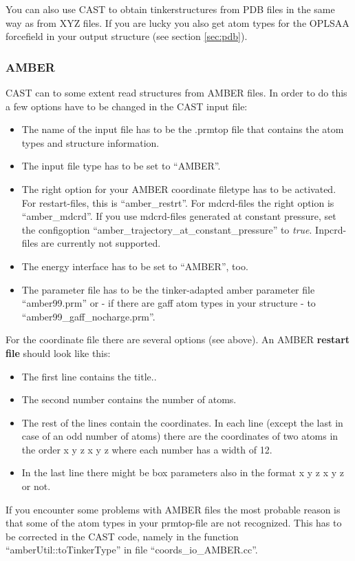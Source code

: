 \documentclass[10pt,a4paper]{article} %
\begin{document}
	You can also use CAST to obtain tinkerstructures from PDB files in the same way as from XYZ files. If you are lucky you also get atom types for the OPLSAA forcefield in your output structure (see section \ref{sec:pdb}).
	
	\subsubsection{AMBER}

\ac{CAST} can to some extent read structures from \ac{AMBER} files. In order to do this a few options have to be changed in the CAST input file:
\begin{itemize}
\item The name of the input file has to be the .prmtop file that contains the atom types and structure information.
\item The input file type has to be set to ``AMBER''.
\item The right option for your AMBER coordinate filetype has to be activated. For restart-files, this is ``amber\_restrt''. For mdcrd-files the right option is ``amber\_mdcrd''. If you use mdcrd-files generated at constant pressure, set the configoption ``amber\_trajectory\_at\_constant\_pressure'' to \textit{true}. Inpcrd-files are currently not supported.
\item The energy interface has to be set to ``AMBER'', too.
\item The parameter file has to be the tinker-adapted amber parameter file ``amber99.prm'' or - if there are gaff atom types in your structure - to ``amber99\_gaff\_nocharge.prm''.
\end{itemize}

For the coordinate file there are several options (see above). An AMBER \textbf{restart file }should look like this:
\begin{itemize}
\item The first line contains the title..
\item The second number contains the number of atoms.
\item The rest of the lines contain the coordinates. In each line (except the last in case of an odd number of atoms) there are the coordinates of two atoms in the order x y z x y z where each number has a width of 12.
\item In the last line there might be box parameters also in the format x y z x y z or not.
\end{itemize}

If you encounter some problems with \ac{AMBER} files the most probable reason is that some of the atom types in your prmtop-file are not recognized. This has to be corrected in the \ac{CAST} code, namely in the function ``amberUtil::toTinkerType'' in file ``coords\_io\_AMBER.cc''.
\end{document}
